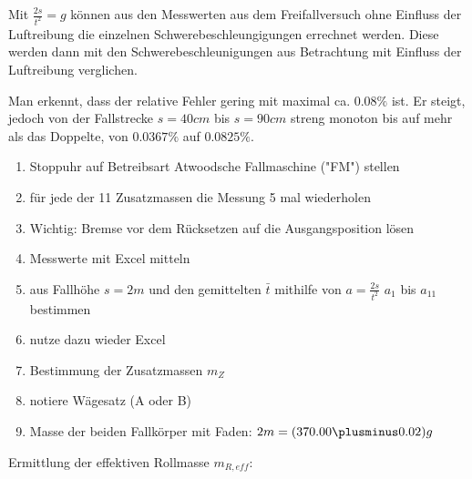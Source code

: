 \documentclass{protokoll}
\begin{document}


Mit $ \frac{2s}{t^2} = g $ können aus den Messwerten aus dem Freifallversuch ohne Einfluss der 
Luftreibung die einzelnen Schwerebeschleungigungen errechnet werden.
Diese werden dann mit den Schwerebeschleunigungen aus Betrachtung mit Einfluss der Luftreibung verglichen.


Man erkennt, dass der relative Fehler gering mit maximal ca. $0.08 \%$ ist.
Er steigt, jedoch von der Fallstrecke $s = 40cm$ bis $s = 90cm$ streng monoton 
bis auf mehr als das Doppelte, von $0.0367 \%$ auf $0.0825 \%$.


\begin{enumerate}

\item Stoppuhr auf Betreibsart Atwoodsche Fallmaschine ("FM") stellen
\item für jede der 11 Zusatzmassen die Messung 5 mal wiederholen
\item Wichtig: Bremse vor dem Rücksetzen auf die Ausgangsposition lösen
\item Messwerte mit Excel mitteln
\item aus Fallhöhe $s = 2m$ und den gemittelten $\bar{t}$ mithilfe von $ a = \frac{2s}{t^2} $
$a_1$ bis $a_{11}$ bestimmen
\item nutze dazu wieder Excel
\item Bestimmung der Zusatzmassen $m_Z$
\item notiere Wägesatz (A oder B)
\item Masse der beiden Fallkörper mit Faden: $2m = (370.00 \plusminus 0.02)g$ 

\end{enumerate}


Ermittlung der effektiven Rollmasse $m_{R,eff}$:
\end{document}
